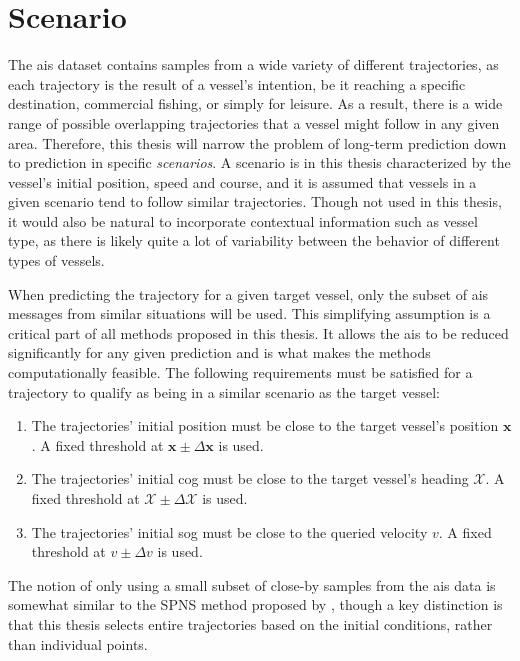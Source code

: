 \section{Scenario}
The \acrshort{ais} dataset contains samples from a wide variety of different trajectories, as each trajectory is the result of a vessel's intention, be it reaching a specific destination, commercial fishing, or simply for leisure. As a result, there is a wide range of possible overlapping trajectories that a vessel might follow in any given area. Therefore, this thesis will narrow the problem of long-term prediction down to prediction in specific \textit{scenarios}. A scenario is in this thesis characterized by the vessel's initial position, speed and course, and it is assumed that vessels in a given scenario tend to follow similar trajectories. Though not used in this thesis, it would also be natural to incorporate contextual information such as vessel type, as there is likely quite a lot of variability between the behavior of different types of vessels. 

When predicting the trajectory for a given target vessel, only the subset of \acrshort{ais} messages from similar situations will be used. This simplifying assumption is a critical part of all methods proposed in this thesis. It allows the \acrshort{ais} to be reduced significantly for any given prediction and is what makes the methods computationally feasible. The following requirements must be satisfied for a trajectory to qualify as being in a similar scenario as the target vessel:
\begin{enumerate}
    \item The trajectories' initial position must be close to the target vessel's position $\boldsymbol{x}$. A fixed threshold at $\boldsymbol{x} \pm \Delta \boldsymbol{x}$ is used.
    \item The trajectories' initial \acrshort{cog} must be close to the target vessel's heading $\mathcal{X}$. A fixed threshold at $\mathcal{X} \pm \Delta \mathcal{X}$ is used.
    \item The trajectories' initial \acrshort{sog} must be close to the queried velocity $v$. A fixed threshold at $v \pm \Delta v$ is used.
\end{enumerate}


The notion of only using a small subset of close-by samples from the \acrshort{ais} data is somewhat similar to the SPNS method proposed by \cite{Hexeberg2017AISbasedVT}, though a key distinction is that this thesis selects entire trajectories based on the initial conditions, rather than individual points. 

